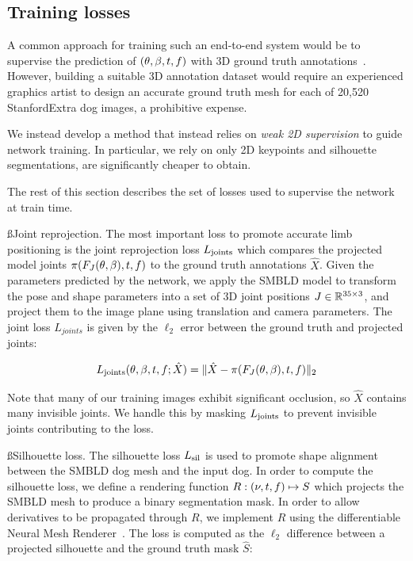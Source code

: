 \subsection{Training losses}

A common approach for training such an end-to-end system would be to supervise the prediction of $(\theta, \beta, t, f)$ with 3D ground truth annotations~\cite{kolotouros19learning,kanazawa18end-to-end,pavlakos18learning}. However, building a suitable 3D annotation dataset would require an experienced graphics artist to design an accurate ground truth mesh for each of 20,520 StanfordExtra dog images, a prohibitive expense.


We instead develop a method that instead relies on \emph{weak 2D supervision} to guide network training. In particular, we rely on only 2D keypoints and silhouette segmentations, are significantly cheaper to obtain.

The rest of this section describes the set of losses used to supervise the network at train time.

\ss{Joint reprojection.}
The most important loss to promote accurate limb positioning is the joint reprojection loss $L_{\textrm{joints}}$ which compares the projected model joints $\pi(F_{J}(\theta, \beta), t, f)$ to the ground truth annotations $\hat{X}$. Given the parameters predicted by the network, we apply the SMBLD model to transform the pose and shape parameters into a set of 3D joint positions $J \in {\mathbb{R}^{35 \times 3}}$, and project them to the image plane using translation and camera parameters. The joint loss $L_{joints}$ is given by the $\ell_2$ error between the ground truth and projected joints:

\begin{equation}
L_{\textrm{joints}}(\theta, \beta, t, f; \hat{X}) = \lVert \hat{X} - \pi(F_{J}(\theta, \beta), t, f) \rVert_{2}
\end{equation}

Note that many of our training images exhibit significant occlusion, so $\hat{X}$ contains many invisible joints. We handle this by masking $L_{\textrm{joints}}$ to prevent invisible joints contributing to the loss.

\ss{Silhouette loss.}
The silhouette loss $L_{\textrm{sil}}$ is used to promote shape alignment between the SMBLD dog mesh and the input dog. In order to compute the silhouette loss, we define a rendering function $R: (\nu, t, f) \mapsto S$ which projects the SMBLD mesh to produce a binary segmentation mask. In order to allow derivatives to be propagated through $R$, we implement $R$ using the differentiable Neural Mesh Renderer~\cite{kato2018renderer}. The loss is computed as the $\ell_2$ difference between a projected silhouette and the ground truth mask $\hat{S}$:


